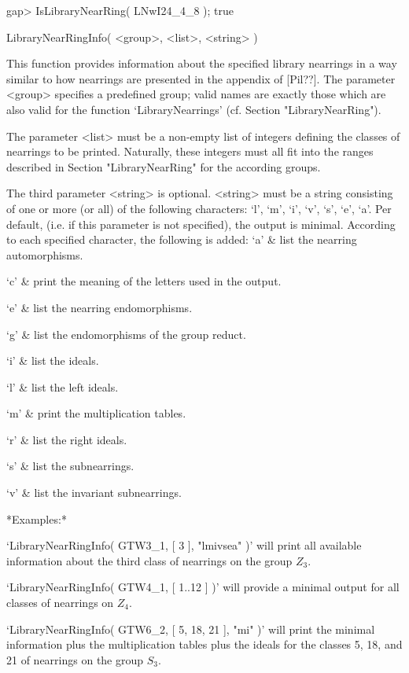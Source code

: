 \beginexample
    gap> IsLibraryNearRing( LNwI24_4_8 );
    true
\endexample



\>LibraryNearRingInfo( <group>, <list>, <string> )

This function provides information about the specified library nearrings
in a way similar to how nearrings are presented in the appendix of
[Pil??].%
The parameter <group> specifies a predefined group; valid
names are exactly those which are also valid for the function
`Library\-Near\-rings' (cf. Section "LibraryNearRing"). 

The parameter <list> must be a non-empty list of integers defining the 
classes of nearrings to be printed. Naturally, these integers must all fit 
into the ranges described in Section "LibraryNearRing" for the according
groups.

The third parameter <string> is optional. <string> must be a string
consisting of one or more (or all) of the following characters:
`l', `m', `i', `v', `s', `e', `a'.
Per default, (i.e. if this parameter is not specified), the output is 
minimal. According to each specified character, the following is added:
\beginitems
  `a' & list the nearring automorphisms.

  `c' & print the meaning of the letters used in the output.

  `e' & list the nearring endomorphisms.

  `g' & list the endomorphisms of the group reduct.

  `i' & list the ideals.

  `l' & list the left ideals.

  `m' & print the multiplication tables.

  `r' & list the right ideals.

  `s' & list the subnearrings.

  `v' & list the invariant subnearrings.

\enditems

*Examples:*

`LibraryNearRingInfo( GTW3\_1, [ 3 ], "lmivsea" )' will print all
available information about the third class of nearrings on the group
$Z_3$.

`LibraryNearRingInfo( GTW4\_1, [ 1..12 ] )' will provide a minimal output
for all classes of nearrings on $Z_4$.

`LibraryNearRingInfo( GTW6\_2, [ 5, 18, 21 ], "mi" )' will print
the minimal information plus the multiplication tables plus the ideals for
the classes 5, 18, and 21 of nearrings on the group $S_3$.



